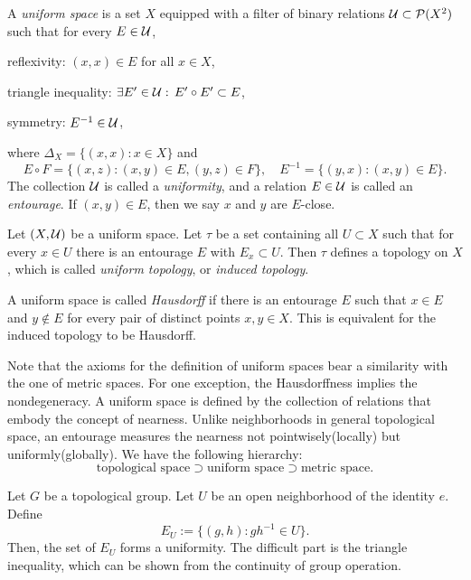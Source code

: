 \documentclass{../crs}
\begin{document}
\begin{defn}
A \emph{uniform space} is a set $X$ equipped with a filter of binary relations $\mathcal{U}\subset\mathcal{P}(X^2)$ such that for every $E\in\mathcal{U}$,
\begin{cond}
\item reflexivity: $(x,x)\in E$ for all $x\in X$,
\item triangle inequality: $\exists E'\in\mathcal{U}:\,E'\circ E'\subset E$,
\item symmetry: $E^{-1}\in\mathcal{U}$,
\end{cond}
where $\Delta_X=\{(x,x):x\in X\}$ and
\[E\circ F=\{(x,z):(x,y)\in E,(y,z)\in F\},\quad E^{-1}=\{(y,x):(x,y)\in E\}.\]
The collection $\mathcal{U}$ is called a \emph{uniformity}, and a relation $E\in\mathcal{U}$ is called an \emph{entourage}.
If $(x,y)\in E$, then we say $x$ and $y$ are $E$-close.
\end{defn}
\begin{defn}
Let $(X,\mathcal{U})$ be a uniform space.
Let $\tau$ be a set containing all $U\subset X$ such that for every $x\in U$ there is an entourage $E$ with $E_x\subset U$.
Then $\tau$ defines a topology on $X$, which is called \emph{uniform topology}, or \emph{induced topology}.
\end{defn}
\begin{defn}
A uniform space is called \emph{Hausdorff} if there is an entourage $E$ such that $x\in E$ and $y\notin E$ for every pair of distinct points $x,y\in X$.
This is equivalent for the induced topology to be Hausdorff.
\end{defn}

Note that the axioms for the definition of uniform spaces bear a similarity with the one of metric spaces.
For one exception, the Hausdorffness implies the nondegeneracy.
A uniform space is defined by the collection of relations that embody the concept of nearness.
Unlike neighborhoods in general topological space, an entourage measures the nearness not pointwisely(locally) but uniformly(globally).
We have the following hierarchy:
\[\text{topological space} \supset \text{uniform space} \supset \text{metric space}.\]
\begin{ex}
Let $G$ be a topological group.
Let $U$ be an open neighborhood of the identity $e$.
Define
\[E_U:=\{(g,h):gh^{-1}\in U\}.\]
Then, the set of $E_U$ forms a uniformity.
The difficult part is the triangle inequality, which can be shown from the continuity of group operation.
\end{ex}
\end{document}
